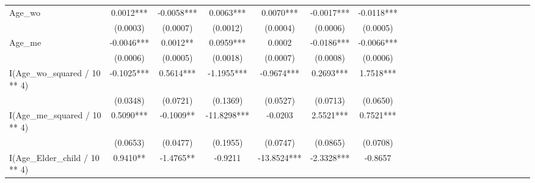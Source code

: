 \begin{subappendices}
{\begin{landscape}
\begin{table}[H]
{\begin{tabular}{lccccccccccccccccccccc}
\midrule
Age_wo                                            & 0.0012***               &     -0.0058***             &   0.0063***                    &  0.0070***                   &                   -0.0017***     &       -0.0118***                           \\
                                                  & (0.0003)                &     (0.0007)               &   (0.0012)                     &  (0.0004)                    &                   (0.0006)       &       (0.0005)                             \\
Age_me                                            & -0.0046***              &     0.0012**               &   0.0959***                    &  0.0002                      &                   -0.0186***     &       -0.0066***                           \\
                                                  & (0.0006)                &     (0.0005)               &   (0.0018)                     &  (0.0007)                    &                   (0.0008)       &       (0.0006)                             \\
I(Age_wo_squared / 10 ** 4)                       & -0.1025***              &     0.5614***              &   -1.1955***                   &  -0.9674***                  &                   0.2693***      &       1.7518***                            \\
                                                  & (0.0348)                &     (0.0721)               &   (0.1369)                     &  (0.0527)                    &                   (0.0713)       &       (0.0650)                             \\
I(Age_me_squared / 10 ** 4)                       & 0.5090***               &     -0.1009**              &   -11.8298***                  &  -0.0203                     &                   2.5521***      &       0.7521***                            \\
                                                  & (0.0653)                &     (0.0477)               &   (0.1955)                     &  (0.0747)                    &                   (0.0865)       &       (0.0708)                             \\
I(Age_Elder_child / 10 ** 4)                      & 0.9410**                &     -1.4765**              &   -0.9211                      &  -13.8524***                 &                   -2.3328***     &       -0.8657                              \\

\end{tabular}}
\end{table}
\end{landscape}}
\end{subappendices}
